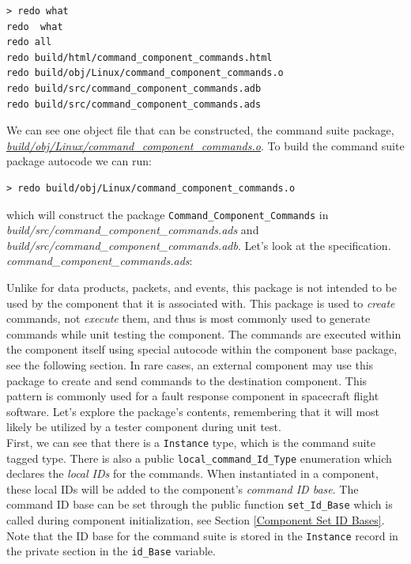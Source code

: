 \vspace{5mm} %
\begin{verbatim}
> redo what 
redo  what
redo all
redo build/html/command_component_commands.html
redo build/obj/Linux/command_component_commands.o
redo build/src/command_component_commands.adb
redo build/src/command_component_commands.ads
\end{verbatim}
\vspace{5mm} %

We can see one object file that can be constructed, the command suite package, \textit{\url{build/obj/Linux/command\_component\_commands.o}}. To build the command suite package autocode we can run:

\vspace{5mm} %
\begin{verbatim}
> redo build/obj/Linux/command_component_commands.o
\end{verbatim}
\vspace{5mm} %

which will construct the package \texttt{Command\_Component\_Commands} in \textit{build/src/command\_component\_commands.ads} and \textit{build/src/command\_component\_commands.adb}. Let's look at the specification. \\

\textit{command\_component\_commands.ads}:

Unlike for data products, packets, and events, this package is not intended to be used by the component that it is associated with. This package is used to \textit{create} commands, not \textit{execute} them, and thus is most commonly used to generate commands while unit testing the component. The commands are executed within the component itself using special autocode within the component base package, see the following section. In rare cases, an external component may use this package to create and send commands to the destination component. This pattern is commonly used for a fault response component in spacecraft flight software. Let's explore the package's contents, remembering that it will most likely be utilized by a tester component during unit test. \\

First, we can see that there is a \texttt{Instance} type, which is the command suite tagged type. There is also a public \texttt{local\_command\_Id\_Type} enumeration which declares the \textit{local IDs} for the commands. When instantiated in a component, these local IDs will be added to the component's \textit{command ID base}. The command ID base can be set through the public function \texttt{set\_Id\_Base} which is called during component initialization, see Section \ref{Component Set ID Bases}. Note that the ID base for the command suite is stored in the \texttt{Instance} record in the private section in the \texttt{id\_Base} variable. \\

